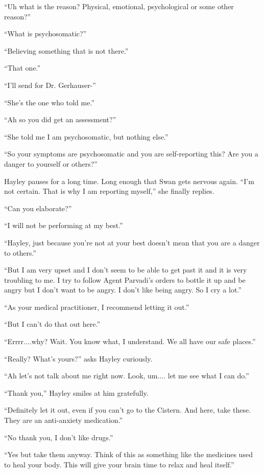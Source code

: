 ``Uh what is the reason?  Physical, emotional, psychological or some other reason?''

``What is psychosomatic?''

``Believing something that is not there.''

``That one.''

``I'll send for Dr. Gerhauser-''

``She's the one who told me.''

``Ah so you did get an assessment?''

``She told me I am psychosomatic, but nothing else.''

``So your symptoms are psychosomatic and you are self-reporting this?  Are you a danger to yourself or others?''

Hayley pauses for a long time.  Long enough that Swan gets nervous again.  ``I'm not certain.  That is why I am reporting myself,'' she finally replies.

``Can you elaborate?''

``I will not be performing at my best.''

``Hayley, just because you're not at your best doesn't mean that you are a danger to others.''

``But I am very upset and I don't seem to be able to get past it and it is very troubling to me.  I try to follow Agent Parvadi's orders to bottle it up and be angry but I don't want to be angry.  I don't like being angry.  So I cry a lot.''

``As your medical practitioner, I recommend letting it out.''

``But I can't do that out here.''

``Errrr....why?  Wait.  You know what, I understand.  We all have our safe places.''

``Really?  What's yours?'' asks Hayley curiously.

``Ah let's not talk about me right now.  Look, um.... let me see what I can do.''

``Thank you,'' Hayley smiles at him gratefully.

``Definitely let it out, even if you can't go to the Cistern.  And here, take these.  They are an anti-anxiety medication.''

``No thank you, I don't like drugs.''

``Yes but take them anyway.  Think of this as something like the medicines used to heal your body.  This will give your brain time to relax and heal itself.''

